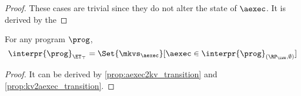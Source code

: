 \begin{proof}
These cases are trivial since they do not alter the state of \( \aexec \).
It is derived by the \ih
\end{proof}

\begin{corollary}
For any program $\prog$, 
\[
\interpr{\prog}_{\ET_{\top}} = \Set{\mkvs_{\aexec} }[ \aexec \in \interpr{\prog}_{(\RP_{\LWW}, \emptyset)}]
\]
\end{corollary}
\begin{proof}
    It can be derived by \cref{prop:aexec2kv_transition} and \cref{prop:kv2aexec_transition}.
\end{proof}


